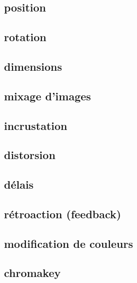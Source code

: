 \documentclass[
]{book}
\begin{document}
\hypertarget{position}{%
\subsection{position}\label{position}}

\hypertarget{rotation}{%
\subsection{rotation}\label{rotation}}

\hypertarget{dimensions}{%
\subsection{dimensions}\label{dimensions}}

\hypertarget{mixage-dimages}{%
\subsection{mixage d'images}\label{mixage-dimages}}

\hypertarget{incrustation}{%
\subsection{incrustation}\label{incrustation}}

\hypertarget{distorsion}{%
\subsection{distorsion}\label{distorsion}}

\hypertarget{duxe9lais}{%
\subsection{délais}\label{duxe9lais}}

\hypertarget{ruxe9troaction-feedback}{%
\subsection{rétroaction (feedback)}\label{ruxe9troaction-feedback}}

\hypertarget{modification-de-couleurs}{%
\subsection{modification de couleurs}\label{modification-de-couleurs}}

\hypertarget{chromakey}{%
\subsection{chromakey}\label{chromakey}}
\end{document}
